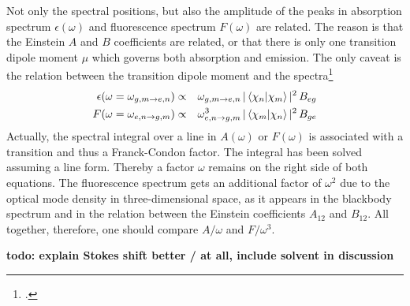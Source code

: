 Not only the spectral positions, but also the amplitude of the peaks in absorption spectrum $\epsilon(\omega)$ and fluorescence spectrum $F(\omega)$ are related. The reason is that the Einstein $A$ and $B$ coefficients are related, or that there is only one transition dipole moment $\mu$ which governs both absorption and emission. The only caveat is the relation between the transition dipole moment and the spectra\footcite[Chapter 5.2]{Parson}
\begin{eqnarray}
   \epsilon(\omega  =  \omega_{g,m \rightarrow e,n} )  & \propto & \omega_{g,m \rightarrow e,n}  \,  | \braket{\chi_n |  \chi_m} |^2 
\, B_{eg} \\
   F(\omega =  \omega_{e,n \rightarrow g,m} ) & \propto & \omega_{e,n \rightarrow g,m}^3 \,  | \braket{\chi_m |  \chi_n} |^2 
\, B_{ge}
\end{eqnarray}
Actually, the spectral integral over a line in $A(\omega )$ or $F(\omega)$ is associated with a transition and thus a Franck-Condon factor. The integral has been solved assuming a line form. Thereby a factor $\omega$ remains on the right side of both equations. The fluorescence spectrum gets an additional factor of $\omega^2$ due to the optical mode density in three-dimensional space, as it appears in the blackbody spectrum and in the relation between the Einstein coefficients $A_{12}$ and $B_{12}$.
All together, therefore, one should compare $A / \omega$ and $F / \omega^3$.






\textbf{todo: explain Stokes shift better / at all, include solvent in discussion}




\printbibliography[segment=\therefsegment,heading=subbibliography]
